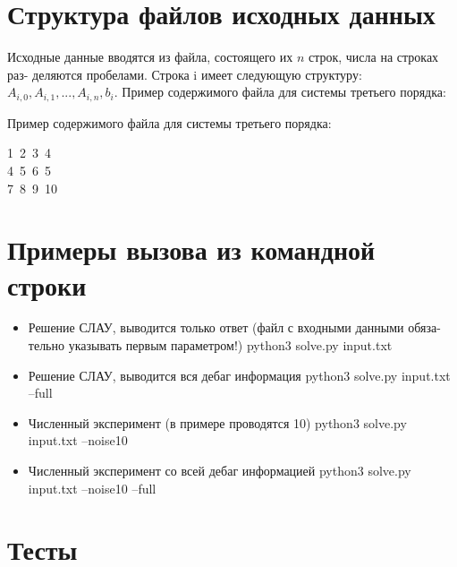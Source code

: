 \documentclass[paper=a4, fontsize=11pt]{scrartcl} %
\numberwithin{equation}{section} %
\numberwithin{figure}{section} %
\numberwithin{table}{section} %
\begin{document}
\section{Структура файлов исходных данных}

Исходные данные вводятся из файла, состоящего их $n$ строк, числа на строках раз- деляются пробелами. Строка i имеет следующую структуру: $A_{i,0}, A_{i,1},..., A_{i,n}, b_{i}$. Пример содержимого файла для системы третьего порядка:

Пример содержимого файла для системы третьего порядка:

\begin{flushleft} 
1\ 2\ 3\ 4\\
4\ 5\ 6\ 5\\
7\ 8\ 9\ 10\\
\end{flushleft}


\section{Примеры вызова из командной строки}

\begin{itemize}
	\item Решение СЛАУ, выводится только ответ (файл с входными данными обяза- тельно указывать первым параметром!)
	\subitem python3 solve.py input.txt

	\item Решение СЛАУ, выводится вся дебаг информация
	\subitem python3 solve.py input.txt –full

	\item Численный эксперимент (в примере проводятся 10)
	\subitem python3 solve.py input.txt –noise10

	\item Численный эксперимент со всей дебаг информацией
	\subitem python3 solve.py input.txt –noise10 –full
\end{itemize}


\section{Тесты}
\end{document}
